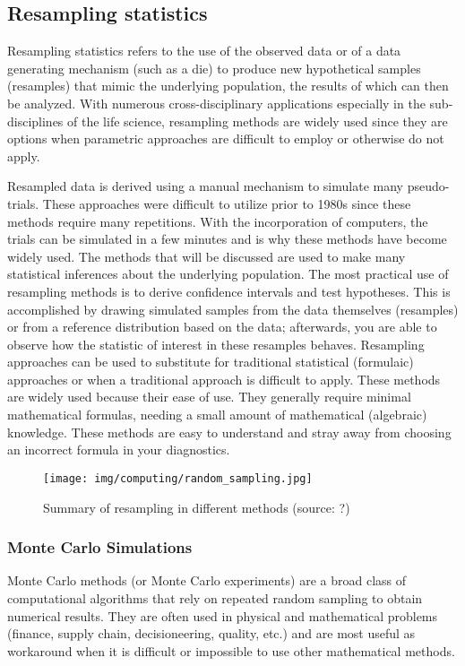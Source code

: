 	\pagebreak

	\subsection{Resampling statistics}	
	Resampling statistics refers to the use of the observed data or of a data generating mechanism (such as a die) to produce new hypothetical samples (resamples) that mimic the underlying population, the results of which can then be analyzed. With numerous cross-disciplinary applications especially in the sub-disciplines of the life science, resampling methods are widely used since they are options when parametric approaches are difficult to employ or otherwise do not apply. 
	
       Resampled data is derived using a manual mechanism to simulate many pseudo-trials. These approaches were difficult to utilize prior to 1980s since these methods require many repetitions. With the incorporation of computers, the trials can be simulated in a few minutes and is why these methods have become widely used.  The methods that will be discussed are used to make many statistical inferences about the underlying population. The most practical use of resampling methods is to derive confidence intervals and test hypotheses. This is accomplished by drawing simulated samples from the data themselves (resamples) or from a reference distribution based on the data; afterwards, you are able to observe how the statistic of interest in these resamples behaves. Resampling approaches can be used to substitute for traditional statistical (formulaic) approaches or when a traditional approach is difficult to apply. These methods are widely used because their ease of use. They generally require minimal mathematical formulas, needing a small amount of mathematical (algebraic) knowledge. These methods are easy to understand and stray away from choosing an incorrect formula in your diagnostics.
      \begin{figure}[H]
		\centering
		\texttt{[image: img/computing/random\_sampling.jpg]}
		\caption[Summary of resampling in different methods]{Summary of resampling in different methods (source: ?)}
	\end{figure}
	
	\subsubsection{Monte Carlo Simulations}\label{monte carlo simulations}
	Monte Carlo methods (or Monte Carlo experiments) are a broad class of computational algorithms that rely on repeated random sampling to obtain numerical results. They are often used in physical and mathematical problems (finance, supply chain, decisioneering, quality, etc.) and are most useful as workaround when it is difficult or impossible to use other mathematical methods.
	
